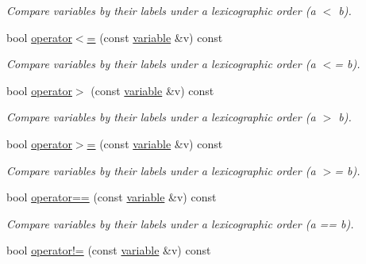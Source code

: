 \begin{DoxyCompactItemize}
\begin{DoxyCompactList}\small\item\em Compare variables by their labels under a lexicographic order (a $<$ b). \end{DoxyCompactList}\item 
bool \hyperlink{classmerlin_1_1variable_a438df3609f56198ebbc45f60c81dea2e}{operator$<$=} (const \hyperlink{classmerlin_1_1variable}{variable} \&v) const \hypertarget{classmerlin_1_1variable_a438df3609f56198ebbc45f60c81dea2e}{}\label{classmerlin_1_1variable_a438df3609f56198ebbc45f60c81dea2e}

\begin{DoxyCompactList}\small\item\em Compare variables by their labels under a lexicographic order (a $<$= b). \end{DoxyCompactList}\item 
bool \hyperlink{classmerlin_1_1variable_a27051e2d5711d2a7ad0533553e28f4c8}{operator$>$} (const \hyperlink{classmerlin_1_1variable}{variable} \&v) const \hypertarget{classmerlin_1_1variable_a27051e2d5711d2a7ad0533553e28f4c8}{}\label{classmerlin_1_1variable_a27051e2d5711d2a7ad0533553e28f4c8}

\begin{DoxyCompactList}\small\item\em Compare variables by their labels under a lexicographic order (a $>$ b). \end{DoxyCompactList}\item 
bool \hyperlink{classmerlin_1_1variable_ad50c1f02bd8af93aa4e61835639ae016}{operator$>$=} (const \hyperlink{classmerlin_1_1variable}{variable} \&v) const \hypertarget{classmerlin_1_1variable_ad50c1f02bd8af93aa4e61835639ae016}{}\label{classmerlin_1_1variable_ad50c1f02bd8af93aa4e61835639ae016}

\begin{DoxyCompactList}\small\item\em Compare variables by their labels under a lexicographic order (a $>$= b). \end{DoxyCompactList}\item 
bool \hyperlink{classmerlin_1_1variable_a5ee4c8e111df2c32f019e972875af434}{operator==} (const \hyperlink{classmerlin_1_1variable}{variable} \&v) const \hypertarget{classmerlin_1_1variable_a5ee4c8e111df2c32f019e972875af434}{}\label{classmerlin_1_1variable_a5ee4c8e111df2c32f019e972875af434}

\begin{DoxyCompactList}\small\item\em Compare variables by their labels under a lexicographic order (a == b). \end{DoxyCompactList}\item 
bool \hyperlink{classmerlin_1_1variable_a935984b9d304974df224cf5dc825438e}{operator!=} (const \hyperlink{classmerlin_1_1variable}{variable} \&v) const \hypertarget{classmerlin_1_1variable_a935984b9d304974df224cf5dc825438e}{}\label{classmerlin_1_1variable_a935984b9d304974df224cf5dc825438e}


\end{DoxyCompactItemize}
